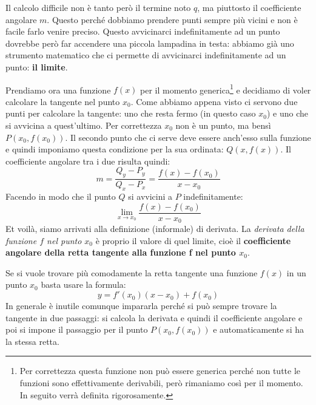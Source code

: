 Il calcolo difficile non è tanto però il termine noto $q$, ma piuttosto il 
coefficiente angolare $m$. Questo perché dobbiamo prendere punti sempre più 
vicini e non è facile farlo venire preciso. Questo avvicinarci indefinitamente 
ad un punto dovrebbe però far accendere una piccola lampadina in testa: abbiamo 
già uno strumento matematico che ci permette di avvicinarci indefinitamente ad 
un punto: \textbf{il limite}. 

Prendiamo ora una funzione $f(x)$ per il momento generica\footnote{Per 
correttezza questa funzione non può essere generica perché non tutte le 
funzioni sono effettivamente derivabili, però rimaniamo così per il momento. 
In seguito verrà definita rigorosamente.} e decidiamo di voler calcolare la 
tangente nel punto $x_0$. Come abbiamo appena visto ci servono due punti per 
calcolare la tangente: uno che resta fermo (in questo caso $x_0$) e uno che si 
avvicina a quest'ultimo. Per correttezza $x_0$ non è un punto, ma bensì $P(x_0, 
f(x_0))$. Il secondo punto che ci serve deve essere anch'esso sulla funzione e 
quindi imponiamo questa condizione per la sua ordinata: $Q(x, f(x))$. Il 
coefficiente angolare tra i due risulta quindi:
\begin{equation*}
	m = \dfrac{Q_y - P_y}{Q_x - P_x} = \dfrac{f(x) - f(x_0)}{x-x_0}
\end{equation*}
Facendo in modo che il punto $Q$ si avvicini a $P$ indefinitamente:
\begin{equation*}
	\lim_{x \to x_0} \dfrac{f(x) - f(x_0)}{x-x_0}
\end{equation*}
Et voilà, siamo arrivati alla definizione (informale) di derivata. La 
\textit{derivata della funzione $f$ nel punto $x_0$} è proprio il valore di 
quel limite, cioè il \textbf{coefficiente angolare della retta tangente alla 
funzione f nel punto $x_0$}. 

Se si vuole trovare più comodamente la retta tangente una funzione $f(x)$ in un 
punto $x_0$ basta usare la formula:
\begin{equation*}
	y = f'(x_0) (x - x_0) + f(x_0)
\end{equation*}
In generale è inutile comunque impararla perché si può sempre trovare la 
tangente in due passaggi: si calcola la derivata e quindi il coefficiente 
angolare e poi si impone il passaggio per il punto $P(x_0, f(x_0))$ e 
automaticamente si ha la stessa retta.\\

